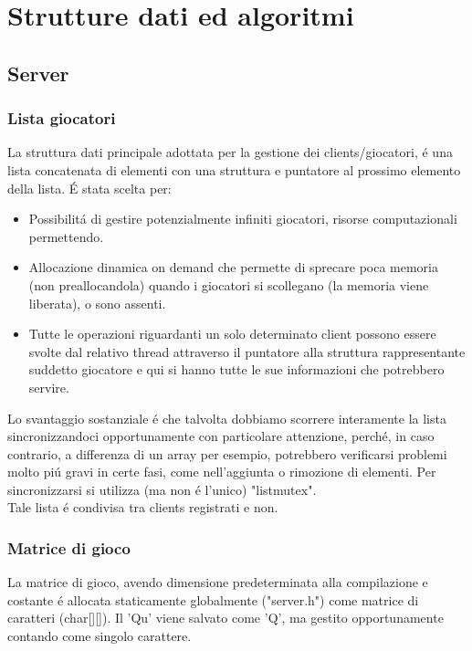 \chapter{Strutture dati ed algoritmi}

\section{Server}

\subsection{Lista giocatori}

La struttura dati principale adottata per la gestione dei clients/giocatori, \'e una lista concatenata di elementi con una struttura e puntatore al prossimo elemento della lista. \'E stata scelta per:

\begin{itemize}
\item Possibilit\'a di gestire potenzialmente infiniti giocatori, risorse computazionali permettendo.
\item Allocazione dinamica on demand che permette di sprecare poca memoria (non preallocandola) quando i giocatori si scollegano (la memoria viene liberata), o sono assenti.
\item Tutte le operazioni riguardanti un solo determinato client possono essere svolte dal relativo thread attraverso il puntatore alla struttura rappresentante suddetto giocatore e qui si hanno tutte le sue informazioni che potrebbero servire.
\end{itemize}
\leavevmode
Lo svantaggio sostanziale \'e che talvolta dobbiamo scorrere interamente la lista sincronizzandoci opportunamente con particolare attenzione, perch\'e, in caso contrario, a differenza di un array per esempio, potrebbero verificarsi problemi molto pi\'u gravi in certe fasi, come nell'aggiunta o rimozione di elementi. Per sincronizzarsi si utilizza (ma non \'e l'unico) "listmutex".
\\
Tale lista \'e condivisa tra clients registrati e non.
 \\
 
\subsection{Matrice di gioco}

La matrice di gioco, avendo dimensione predeterminata alla compilazione e costante \'e allocata staticamente globalmente ("server.h") come matrice di caratteri (char[][]). Il 'Qu' viene salvato come 'Q', ma gestito opportunamente contando come singolo carattere.
\\

